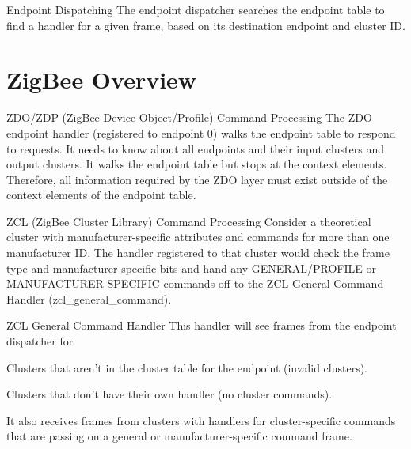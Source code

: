 \begin{DoxyParagraph}{Endpoint Dispatching}
The endpoint dispatcher searches the endpoint table to find a handler for a given frame, based on its destination endpoint and cluster I\-D.
\end{DoxyParagraph}
\hypertarget{index_zigbee_overview}{}\section{Zig\-Bee Overview}\label{index_zigbee_overview}
\begin{DoxyParagraph}{Z\-D\-O/\-Z\-D\-P (Zig\-Bee Device Object/\-Profile) Command Processing}
The Z\-D\-O endpoint handler (registered to endpoint 0) walks the endpoint table to respond to requests. It needs to know about all endpoints and their input clusters and output clusters. It walks the endpoint table but stops at the context elements. Therefore, all information required by the Z\-D\-O layer must exist outside of the context elements of the endpoint table.
\end{DoxyParagraph}
\begin{DoxyParagraph}{Z\-C\-L (Zig\-Bee Cluster Library) Command Processing}
Consider a theoretical cluster with manufacturer-\/specific attributes and commands for more than one manufacturer I\-D. The handler registered to that cluster would check the frame type and manufacturer-\/specific bits and hand any G\-E\-N\-E\-R\-A\-L/\-P\-R\-O\-F\-I\-L\-E or M\-A\-N\-U\-F\-A\-C\-T\-U\-R\-E\-R-\/\-S\-P\-E\-C\-I\-F\-I\-C commands off to the Z\-C\-L General Command Handler (zcl\-\_\-general\-\_\-command).
\end{DoxyParagraph}
\begin{DoxyParagraph}{Z\-C\-L General Command Handler}
This handler will see frames from the endpoint dispatcher for
\begin{DoxyItemize}
\item Clusters that aren't in the cluster table for the endpoint (invalid clusters).
\item Clusters that don't have their own handler (no cluster commands).
\end{DoxyItemize}
\end{DoxyParagraph}
It also receives frames from clusters with handlers for cluster-\/specific commands that are passing on a general or manufacturer-\/specific command frame.

